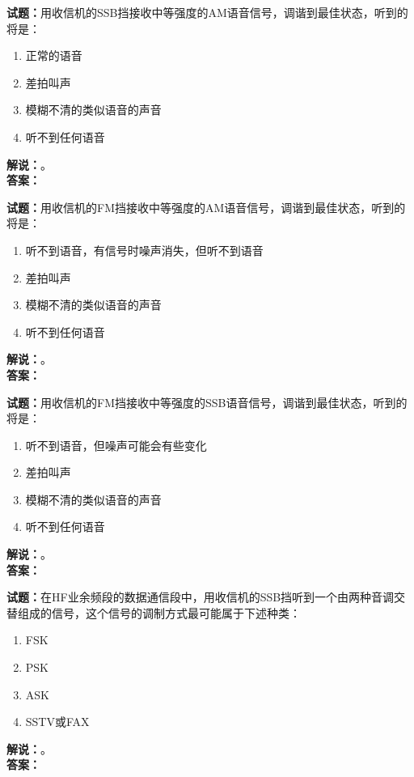 \documentclass{ctexbook}
\begin{document}
\bigskip




\noindent\textbf{试题：}用收信机的SSB挡接收中等强度的AM语音信号，调谐到最佳状态，听到的将是：
\begin{enumerate}[leftmargin=3em]
\item 正常的语音
\item 差拍叫声
\item 模糊不清的类似语音的声音
\item 听不到任何语音
\end{enumerate}
\noindent\textbf{解说：}\textbf{}。\\\noindent\textbf{答案：}

\bigskip




\noindent\textbf{试题：}用收信机的FM挡接收中等强度的AM语音信号，调谐到最佳状态，听到的将是：
\begin{enumerate}[leftmargin=3em]
\item 听不到语音，有信号时噪声消失，但听不到语音
\item 差拍叫声
\item 模糊不清的类似语音的声音
\item 听不到任何语音
\end{enumerate}
\noindent\textbf{解说：}\textbf{}。\\\noindent\textbf{答案：}

\bigskip




\noindent\textbf{试题：}用收信机的FM挡接收中等强度的SSB语音信号，调谐到最佳状态，听到的将是：
\begin{enumerate}[leftmargin=3em]
\item 听不到语音，但噪声可能会有些变化
\item 差拍叫声
\item 模糊不清的类似语音的声音
\item 听不到任何语音
\end{enumerate}
\noindent\textbf{解说：}\textbf{}。\\\noindent\textbf{答案：}

\bigskip




\noindent\textbf{试题：}在HF业余频段的数据通信段中，用收信机的SSB挡听到一个由两种音调交替组成的信号，这个信号的调制方式最可能属于下述种类：
\begin{enumerate}[leftmargin=3em]
\item FSK
\item PSK
\item ASK
\item SSTV或FAX
\end{enumerate}
\noindent\textbf{解说：}\textbf{}。\\\noindent\textbf{答案：}
\end{document}
